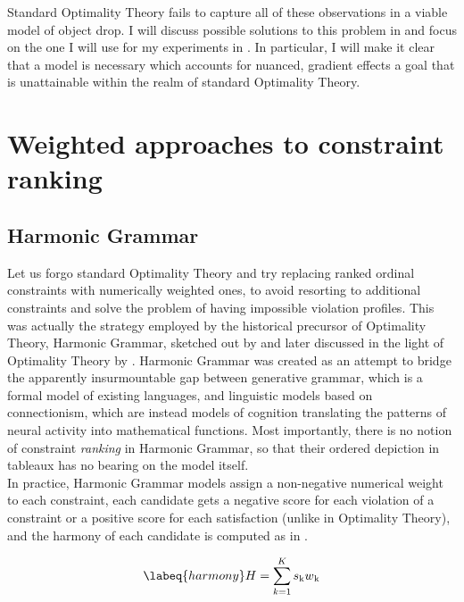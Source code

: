 Standard Optimality Theory fails to capture all of these observations in a viable model of object drop. I will discuss possible solutions to this problem in  and focus on the one I will use for my experiments in . In particular, I will make it clear that a model is necessary which accounts for nuanced, gradient effects \textemdash a goal that is unattainable within the realm of standard Optimality Theory.

\section{Weighted approaches to constraint ranking}

\subsection{Harmonic Grammar}  %
Let us forgo standard Optimality Theory and try replacing ranked ordinal constraints with numerically weighted ones, to avoid resorting to additional constraints and solve the problem of having impossible violation profiles. 
This was actually the strategy employed by the historical precursor of Optimality Theory, Harmonic Grammar, sketched out by \textcite{smolensky1993integrating, legendre1990can, legendre1991unifying} and later discussed in the light of Optimality Theory by \textcite{legendre2006optimality, pater2009weighted}. Harmonic Grammar was created as an attempt to bridge the apparently insurmountable gap between generative grammar, which is a formal model of existing languages, and linguistic models based on connectionism, which are instead models of cognition translating the patterns of neural activity into mathematical functions. Most importantly, there is no notion of constraint \textit{ranking} in Harmonic Grammar, so that their ordered depiction in tableaux has no bearing on the model itself.\\
In practice, Harmonic Grammar models assign a non-negative numerical weight to each constraint, each candidate gets a negative score for each violation of a constraint or a positive score for each satisfaction (unlike in Optimality Theory), and the harmony of each candidate is computed as in . 

\begin{equation} \labeq{harmony} %
H = \sum_{k=1}^{K} s\textsubscript{k} w\textsubscript{k}
\end{equation}

